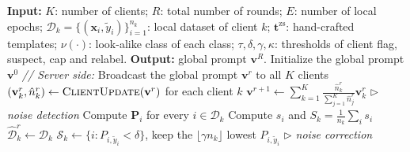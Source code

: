 %

\begin{algorithm}[t]
\caption{FedCLEAR}
\label{alg:fedclear}
\begin{algorithmic}[1]
\Statex \textbf{Input:}
\State $K$: number of clients; $R$: total number of rounds; $E$: number of local epochs;
\State $\mathcal{D}_k = \{(\mathbf{x}_i, \tilde{y}_i)\}_{i=1}^{n_k}$: local dataset of client $k$;
\State $\mathbf{t}^{\mathrm{zs}}$: hand-crafted templates; $\nu(\cdot)$: look-alike class of each class;
\State $\tau, \delta, \gamma, \kappa$: thresholds of client flag, suspect, cap and relabel.
\Statex \textbf{Output:} global prompt $\mathbf{v}^{R}$.
\State Initialize the global prompt $\mathbf{v}^{0}$
    \State \textit{// Server side:}
    \State Broadcast the global prompt $\mathbf{v}^{r}$ to all $K$ clients
    \State $(\mathbf{v}^{r}_k, \hat{n}^{r}_k) \gets \textsc{ClientUpdate}(\mathbf{v}^{r})$ for each client $k$
    \State $\mathbf{v}^{r+1} \gets \sum_{k=1}^{K} \frac{\hat{n}^{r}_k}{\sum_{j=1}^{K} \hat{n}^{r}_j} \mathbf{v}^{r}_k$
    \Statex
            \State $\triangleright$ \textit{noise detection}
            \State Compute $\mathbf{P}_i$ for every $i \in \mathcal{D}_k$
            \State Compute $s_i$ and $S_k = \frac{1}{n_k}\sum_i s_i$
            \State $\hat{\mathcal{D}}^{r}_k \gets \mathcal{D}_k$
                \State $\mathcal{S}_k \gets \{ i : P_{i,\tilde{y}_i} < \delta \}$, keep the
                       $\lfloor \gamma n_k \rfloor$ lowest $P_{i,\tilde{y}_i}$
                \State $\triangleright$ \textit{noise correction}

\end{algorithmic}
\end{algorithm}
